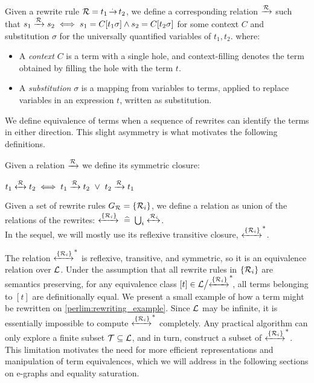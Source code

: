 \begin{definition}\label{screening:rw-equiv}
Given a rewrite rule $\mathcal{R} = t_1 \operatorname{\overset{.\,}{\rightarrow}} t_2$, we define a corresponding relation
$\xrightarrow[]{\mathcal{R}}$ such that $s_1 \xrightarrow[]{\mathcal{R}} s_2 \iff s_1=C[t_1\sigma] \land s_2=C[t_2\sigma]$
for some context $C$ and substitution $\sigma$ for the universally quantified variables of $t_1, t_2$.
where:
\begin{itemize}
    \item A \emph{context} $C$ is a term with a single hole, and \gls{context-filling} denotes the term obtained by filling the hole with the term $t$.
    \item A \emph{substitution} $\sigma$ is a mapping from variables to terms, applied to replace variables in an expression $t$, written as \gls{substitution}.
\end{itemize}
\end{definition}

We define equivalence of terms when a sequence of rewrites can identify the terms in either direction.
This slight asymmetry is what motivates the following definitions.

\begin{definition}\label{screening:symmetric}
Given a relation $\xrightarrow[]{\mathcal{R}}$ we define its symmetric closure:

\centering
$t_1 \xleftrightarrow[]{\mathcal{R}\,} t_2 \iff t_1 \xrightarrow[]{\mathcal{R}} t_2 ~\lor~ t_2 \xrightarrow[]{\mathcal{R}} t_1$
\end{definition}

\begin{definition}\label{screening:rw-set-equiv}
Given a set of rewrite rules $G_{\mathcal{R}}=\{\mathcal{R}_i\}$, we define a relation as union of the relations of the rewrites: $\xleftrightarrow[]{\{\mathcal{R}_i\}} \operatorname{~\widehat{=}~} \bigcup_{i}\xleftrightarrow[]{\mathcal{R}_i}$.\\
In the sequel, we will mostly use its reflexive transitive closure, $\xleftrightarrow[]{\{\mathcal{R}_i\}}^*$.
\end{definition}

The relation $\xleftrightarrow[]{\{\mathcal{R}_i\}}^*$ is reflexive, transitive, and symmetric,
so it is an equivalence relation over $\mathcal{L}$.
Under the assumption that all rewrite rules in $\{\mathcal{R}_i\}$ are semantics preserving, for any equivalence class $[t] \in \mathcal{L} \big/ {\xleftrightarrow[]{\{\mathcal{R}_i\}}^*}\!$, all terms belonging to $[t]$ are definitionally equal.
We present a small example of how a term might be rewritten on \autoref{perlim:rewriting_example}.
Since $\mathcal{L}$ may be infinite, it is essentially impossible to compute $\xleftrightarrow[]{\{\mathcal{R}_i\}}^*$ completely. 
Any practical algorithm can only explore a finite subset $\mathcal{T} \subseteq \mathcal{L}$, and in turn, construct a subset of $\xleftrightarrow[]{\{\mathcal{R}_i\}}^*$. 
This limitation motivates the need for more efficient representations and manipulation of term equivalences, which we will address in the following sections on e-graphs and equality saturation.

